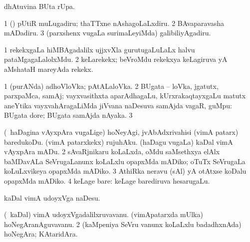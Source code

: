 {\bentry
{} 
\gl{\kirx}
\expl{}
\bmng
  dhAtuvina BUta rUpa. 
\emng
\eentry

\bentry
{} 
\gl{\sakirx}
\expl{}
\bmng
\bnum
\num{1} (\hA) pUtiR muLugadiru; thaTTxne nAshagoLaLxdiru. 
\num{2} BAvaparavasha mADadiru. 
\num{3} (parxshenx \mo vugaLa surimaLeyiMda) galibiliyAgadiru. 
\enum
\emng
\eentry

\bentry
{} 
\gl{\nA}
\expl{}
\bmng
\bnum
\num{1} rekekxgaLa hiMBAgadalilx ujjxvXla gurutugaLuLaLx halvu pataMgagaLalolxMdu. 
\num{2} keLarekekx; beVroMdu rekekxya keLagiruva yA aMshataH mareyAda rekekx. 
\enum
\emng
\eentry

\bentry
{} 
\gl{\nA}
\expl{}
\bmng
\emng
\eentry

\bentry
{} 
\gl{\nA}
\expl{}
\bmng
\bnum
\num{1} (purANda) adhoVloVka; pAtALaloVka. 
\num{2} BUgata -- loVka, jgatutx, parxpaMca, samAj; vayxvasithxta aparAdhagaLu, kUrxrakaqtayxgaLu matutx aneYtika vayxvahAragaLiMda jiVvana naDesuva samAjda vagaR, guMpu:  BUgata dore; BUgata samAjda nAyaka. 
\num{3}  
\enum
\emng
\eentry

\bentry
{} 
\gl{\kirx}
\bmng
\emng

\noindent
\gl{\sakirx}
\bmng
\bnum
{} (\kanmu\ haDagina vAyxpAra \mo vugaLige) 
\banum
{} hoNeyAgi, jvAbAdxrivahisi (vimA patarx) baredukoDu. 
 (vimA patarxkekx) rujuhAku. 
 (haDagu \mo vugaLa) kaDal vimA vAyxpAra mADu. 
\eanum
\numie
\num{2} sAvaRjnikaru koLaLxda, oMdu saMsethxya elAlx baMDavALa SeVrugaLanunx koLaLxlu opapxMda mADiko; oTuTx SeVrugaLa koLuLxvikeya opapxMda mADiko. 
\num{3} AthiRka neravu (sAl) yA otAtxse koDalu opapxMda mADiko. 
\num{4} keLage bare:  keLage barediruva hesarugaLu. 
\enum
\emng

\noindent
\gl{\akirx}
\expl{}
\bmng
kaDal vimA udoyxVga naDesu. 
\emng
\eentry

\bentry
{} 
\gl{\nA}
\expl{}
\bmng
\bnum
{} 
\banum
{} (\kanmu\ kaDal) vimA udoyxVgadalilxruvavanu. 
 (vimApatarxda mUlka) hoNegAranAguvavanu. 
\eanum
\numie
\num{2} (kaMpeniya SeVru \mo vanunx koLaLxlu badadhxnAda) hoNegAra; KAtaridAra. 
\enum
\emng
\eentry

}
